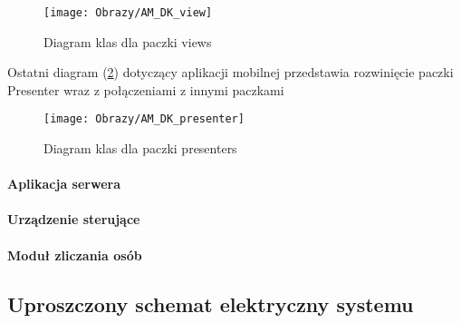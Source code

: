 	\newpage
\begin{figure}[ht!]
	\centering
	\texttt{[image: Obrazy/AM\_DK\_view]}
	\caption{Diagram klas dla paczki views}
	\label{Diagram klas dla paczki views}
\end{figure}
\newpage
Ostatni diagram (\ref{Diagram klas dla paczki presenters}) dotyczący aplikacji mobilnej przedstawia rozwinięcie paczki Presenter wraz z połączeniami z innymi paczkami

		\begin{figure}[ht!]
			\centering
			\texttt{[image: Obrazy/AM\_DK\_presenter]}
			\caption{Diagram klas dla paczki presenters}
			\label{Diagram klas dla paczki presenters}
		\end{figure}

		\newpage		

		\paragraph*{Aplikacja serwera}
		
		\paragraph*{Urządzenie sterujące}
		\paragraph*{Moduł zliczania osób}

\newpage		
\subsection{Uproszczony schemat elektryczny systemu}\label{sec:Schemat elektryczny zamka}

\newpage
